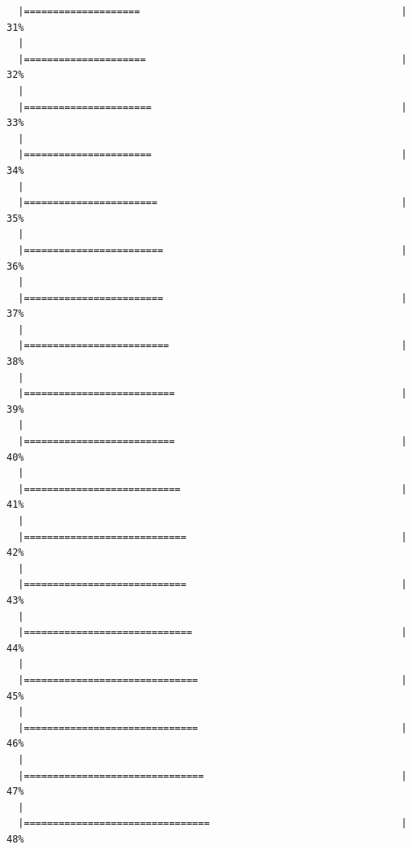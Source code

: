 \documentclass[class=article, crop=false]{standalone}\usepackage[]{graphicx}\usepackage[]{color}
\makeatletter
\newenvironment{kframe}{%
 \def\at@end@of@kframe{}%
 \ifinner\ifhmode%
  \def\at@end@of@kframe{\end{minipage}}%
  \begin{minipage}{\columnwidth}%
 \fi\fi%
 \def\FrameCommand##1{\hskip\@totalleftmargin \hskip-\fboxsep
 \colorbox{shadecolor}{##1}\hskip-\fboxsep
     \hskip-\linewidth \hskip-\@totalleftmargin \hskip\columnwidth}%
 \MakeFramed {\advance\hsize-\width
   \@totalleftmargin\z@ \linewidth\hsize
   \@setminipage}}%
 {\par\unskip\endMakeFramed%
 \at@end@of@kframe}
\newenvironment{knitrout}{}{} %
\makeatother
\begin{document}
\begin{knitrout}
\begin{kframe}
\begin{verbatim}
  |====================                                             |  31%
  |                                                                       
  |=====================                                            |  32%
  |                                                                       
  |======================                                           |  33%
  |                                                                       
  |======================                                           |  34%
  |                                                                       
  |=======================                                          |  35%
  |                                                                       
  |========================                                         |  36%
  |                                                                       
  |========================                                         |  37%
  |                                                                       
  |=========================                                        |  38%
  |                                                                       
  |==========================                                       |  39%
  |                                                                       
  |==========================                                       |  40%
  |                                                                       
  |===========================                                      |  41%
  |                                                                       
  |============================                                     |  42%
  |                                                                       
  |============================                                     |  43%
  |                                                                       
  |=============================                                    |  44%
  |                                                                       
  |==============================                                   |  45%
  |                                                                       
  |==============================                                   |  46%
  |                                                                       
  |===============================                                  |  47%
  |                                                                       
  |================================                                 |  48%

\end{verbatim}
\end{kframe}
\end{knitrout}
\end{document}

